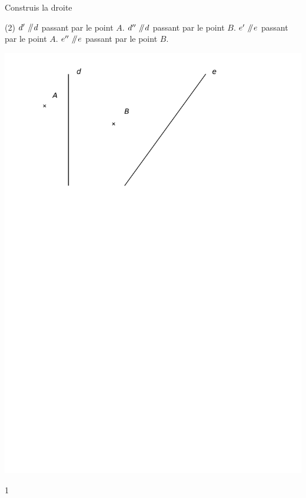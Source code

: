 \documentclass[a4paper,11pt]{report}
\begin{document}
\begin{exop}{Construis la droite
\begin{tasks}[after-item-skip = 0.4em](2)
	\task $d'\mathbin{\;\!/\mkern-5mu/\!} d$ passant par le point $A$.
	\task  $d''\mathbin{\;\!/\mkern-5mu/\!} d$ passant par le point $B$.
	\task  $e'\mathbin{\;\!/\mkern-5mu/\!} e$ passant par le point $A$.
	\task  $e''\mathbin{\;\!/\mkern-5mu/\!} e$ passant par le point $B$.
\end{tasks}
	
\begin{center}
\includegraphics[scale=0.8]{media/es-11/13-8}
\end{center}
    }{1}
\end{exop}
\end{document}
